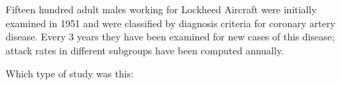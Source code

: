 
Fifteen hundred adult males working for Lockheed Aircraft were
initially examined in 1951 and were classified by diagnosis criteria
for coronary artery disease.  Every 3 years they have been examined
for new cases of this disease; attack rates in different subgroups
have been computed annually.

Which type of study was this:
\begin{MultipleChoice}
\end{MultipleChoice}


